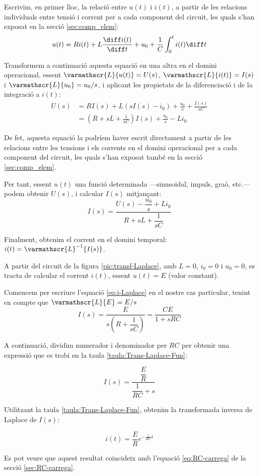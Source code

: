 Escrivim, en primer lloc,  la relació entre $u(t)$ i $i(t)$, a partir
de les relacions individuals entre tensió i corrent per a cada
component del circuit, les quals s'han exposat en la secció
\vref{sec:comp_elem}:
\begin{equation}
    u(t) = R i(t) + L \frac{\diff i(t)}{\diff t} + u_0 + \frac{1}{C}
    \int_0^t i(t) \diff t
\end{equation}

Transformem a continuació aquesta equació en una altra en el domini
operacional, essent $\varmathscr{L}\{u(t)\} = U(s)$,
$\varmathscr{L}\{i(t)\} = I(s)$ i $\varmathscr{L}\{u_0\} =
u_0/s$, i aplicant les propietats de la diferenciació i de la
integració a $i(t)$:
\begin{equation}\begin{split}
    U(s) &= R I(s) + L(s I(s) -i_0) + \frac{u_0}{s} + \frac{I(s)}{s
    C} \\[1ex]
    &= \left( R + s L +\frac{1}{s C}\right)I(s) + \frac{u_0}{s} - L i_0
\end{split}\end{equation}

De fet, aquesta equació la podríem haver escrit directament a
partir de les relacions entre les tensions i els corrents en el
domini operacional per a cada  component del circuit, les quals
s'han exposat també en la secció \ref{sec:comp_elem}.

Per tant, essent $u(t)$  una funció determinada  ---sinusoidal, impuls,
graó, etc.--- podem obtenir $U(s)$, i calcular $I(s)$ mitjançant:
\begin{equation}
    I(s) = \frac{U(s)-\dfrac{u_0}{s} + L i_0}{R + s L
    +\dfrac{1}{s C}}\label{eq:i-Laplace}
\end{equation}

Finalment, obtenim el corrent en el domini temporal: $i(t) =
\varmathscr{L}^{-1}\{I(s)\}$.

	
\begin{exemple}[\ResCircRC{}]
	\addcontentsxms{\ResCircRC}
    A partir del circuit de la figura \vref{pic:transf-Laplace}, amb
    $L=0$, $i_0=0$ i $u_0=0$, es tracta de calcular el corrent $i(t)$,
    essent $u(t)=E$ (valor constant).

    Comencem per escriure l'equació \eqref{eq:i-Laplace} en el nostre
    cas particular, tenint en compte que $\varmathscr{L}\{E\} = E/s$
    \[
        I(s) = \frac{E}{s\left(R + \dfrac{1}{s C}\right)} = \frac{C E}{1 + s R C}
    \]

    A continuació, dividim numerador i denominador per $R C$ per obtenir una expressió que es trobi en la taula
    \vref{taula:Trans-Laplace-Fun}:

    \[
        I(s) = \frac{\dfrac{E}{R}}{\dfrac{1}{R C} + s}
    \]

    Utilitzant la taula \ref{taula:Trans-Laplace-Fun}, obtenim la transformada inversa de Laplace de $I(s)$:

    \[
        i(t) = \frac{E}{R} e^{-\frac{1}{R C}t}
    \]

    Es pot veure que aquest resultat coincideix amb l'equació \eqref{eq:RC-carrega} de la secció \vref{sec:RC-carrega}.
\end{exemple}

